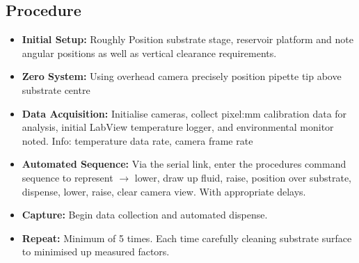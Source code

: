 \subsection{Procedure}
\begin{itemize}
    \item \textbf{Initial Setup:} Roughly Position substrate stage, reservoir platform and note angular positions as well as vertical clearance requirements.
    \item \textbf{Zero System:} Using overhead camera precisely position pipette tip above substrate centre
    \item \textbf{Data Acquisition:} Initialise cameras, collect pixel:mm calibration data for analysis, initial LabView temperature logger, and environmental monitor noted. Info: temperature data rate, camera frame rate
    \item \textbf{Automated Sequence:} Via the serial link, enter the procedures command sequence to represent $\rightarrow$ lower, draw up fluid, raise, position over substrate, dispense, lower, raise, clear camera view. With appropriate delays.
    \item \textbf{Capture:} Begin data collection and automated dispense.
    \item \textbf{Repeat: } Minimum of 5 times. Each time carefully cleaning substrate surface to minimised up measured factors. 
\end{itemize}